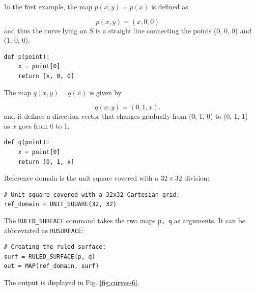 In the first example, the map $p(x, y) = p(x)$ is defined as

$$
p(x, y) = (x, 0, 0)
$$
and thus the curve lying on $S$ is a straight line connecting the points 
(0, 0, 0) and (1, 0, 0). \\

\begin{bbox}
\begin{verbatim}
def p(point):
    x = point[0]
    return [x, 0, 0]
\end{verbatim}
\end{bbox}
\vspace{6mm}

\noindent
The map $q(x, y) = q(x)$ is given by

$$
q(x, y) = (0, 1, x).
$$
and it defines a direction vector that changes gradually from 
(0, 1, 0) to (0, 1, 1) as $x$ goes from 0 to 1.\\

\begin{bbox}
\begin{verbatim}
def q(point):
    x = point[0]
    return [0, 1, x]
\end{verbatim}
\end{bbox}
\vspace{6mm}

\noindent
Reference domain is the unit square covered with a $32 \times 32$
division:\\

\begin{bbox}
\begin{verbatim}
# Unit square covered with a 32x32 Cartesian grid:  
ref_domain = UNIT_SQUARE(32, 32)
\end{verbatim}
\end{bbox}
\vspace{6mm}

\noindent
The {\tt RULED\_SURFACE} command takes the two maps {\tt p, q}
as arguments. It can be abbreviated as {\tt RUSURFACE}: \\

\begin{bbox}
\begin{verbatim}
# Creating the ruled surface:
surf = RULED_SURFACE(p, q)
out = MAP(ref_domain, surf)
\end{verbatim}
\end{bbox}
\vspace{6mm}

\noindent
The output is displayed in Fig. \ref{fig:curves-6}.

